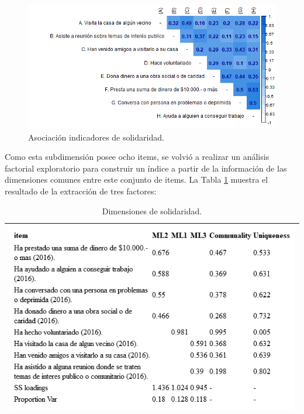 \documentclass[
  12pt,
]{book}
\begin{document}
\begin{figure}[H]

{\centering \includegraphics[width=1\linewidth,height=1\textheight]{output/graphs/solidaridad_cor} 

}

\caption{Asociación indicadores de solidaridad.}\label{fig:solidaridad-cor}
\end{figure}

Como esta subdimensión posee ocho items, se volvió a realizar un análisis factorial exploratorio para construir un índice a partir de la información de las dimensiones comunes entre este conjunto de items. La Tabla \ref{tab:solidaridad-fa} muestra el resultado de la extracción de tres factores:

\begin{longtable}[]{@{}l@{}}
\caption{\label{tab:solidaridad-fa}Dimensiones de solidaridad.}\tabularnewline
\toprule
\endhead
\includegraphics[width=8.33333in,height=\textheight]{output/tables/solidaridad_fa.png} \\
\bottomrule
\end{longtable}
\end{document}
